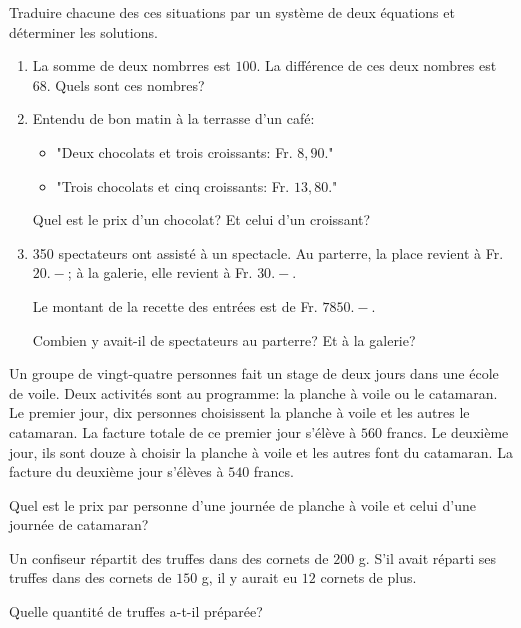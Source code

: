 \documentclass[a4paper,12pt]{report}
\begin{document}

\begin{exo}[1]
	Traduire chacune des ces situations par un système de deux équations et déterminer les solutions.
\begin{enumerate}
	\item La somme de deux nombrres est $100$. La différence de ces deux nombres est $68$. Quels sont ces nombres?
	\item Entendu de bon matin à la terrasse d'un café:
		\begin{itemize}
			\item "Deux chocolats et trois croissants: Fr. $8,90$."
			\item "Trois chocolats et cinq croissants: Fr. $13,80$."
			\end{itemize}
			Quel est le prix d'un chocolat? Et celui d'un croissant?
		\item 350 spectateurs ont assisté à un spectacle. 
			Au parterre, la place revient à Fr. $20.-$; à la galerie, elle revient à Fr. $30.-$.

			Le montant de la recette des entrées est de Fr. $7850.-$.

			Combien y avait-il de spectateurs au parterre? Et à la galerie?
\end{enumerate}
\end{exo}
\begin{exo}[1]
		Un groupe de vingt-quatre personnes fait un stage de deux jours dans une école de voile. Deux activités sont au programme: la planche à voile ou le catamaran. Le premier jour, dix personnes choisissent la planche à voile et les autres le catamaran. La facture totale de ce premier jour s'élève à $560$ francs. Le deuxième jour, ils sont douze à choisir la planche à voile et les autres font du catamaran. La facture du deuxième jour s'élèves à $540$ francs. 

	Quel est le prix par personne d'une journée de planche à voile et celui d'une journée de catamaran?
\end{exo}
\begin{exo}[2]
Un confiseur répartit des truffes dans des cornets de $200$ g. S'il avait réparti ses truffes dans des cornets de $150$ g, il y aurait eu $12$ cornets de plus. 

Quelle quantité de truffes a-t-il préparée?

\end{exo}
\end{document}
